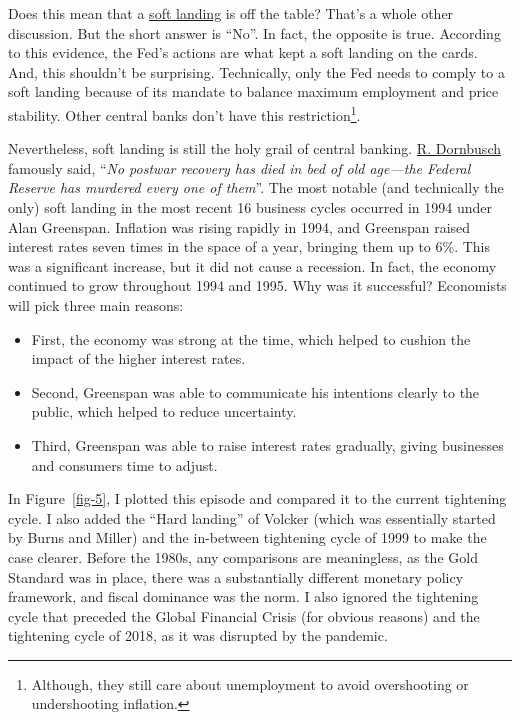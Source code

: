 \documentclass[
  letterpaper,
  DIV=11,
  numbers=noendperiod]{scrartcl}
\providecommand{\tightlist}{%
  \setlength{\itemsep}{0pt}\setlength{\parskip}{0pt}}\usepackage{longtable,booktabs,array}
\begin{document}
Does this mean that a
\href{https://www.investopedia.com/terms/s/softlanding.asp}{soft
landing} is off the table? That's a whole other discussion. But the
short answer is ``No''. In fact, the opposite is true. According to this
evidence, the Fed's actions are what kept a soft landing on the cards.
And, this shouldn't be surprising. Technically, only the Fed needs to
comply to a soft landing because of its mandate to balance maximum
employment and price stability. Other central banks don't have this
restriction\footnote{Although, they still care about unemployment to
  avoid overshooting or undershooting inflation.}.

Nevertheless, soft landing is still the holy grail of central banking.
\href{https://en.wikipedia.org/wiki/Rudi_Dornbusch}{R. Dornbusch}
famously said, ``\emph{No postwar recovery has died in bed of old
age---the Federal Reserve has murdered every one of them}''. The most
notable (and technically the only) soft landing in the most recent 16
business cycles occurred in 1994 under Alan Greenspan. Inflation was
rising rapidly in 1994, and Greenspan raised interest rates seven times
in the space of a year, bringing them up to 6\%. This was a significant
increase, but it did not cause a recession. In fact, the economy
continued to grow throughout 1994 and 1995. Why was it successful?
Economists will pick three main reasons:

\begin{itemize}
\tightlist
\item
  First, the economy was strong at the time, which helped to cushion the
  impact of the higher interest rates.
\item
  Second, Greenspan was able to communicate his intentions clearly to
  the public, which helped to reduce uncertainty.
\item
  Third, Greenspan was able to raise interest rates gradually, giving
  businesses and consumers time to adjust.
\end{itemize}

In Figure~\ref{fig-5}, I plotted this episode and compared it to the
current tightening cycle. I also added the ``Hard landing'' of Volcker
(which was essentially started by Burns and Miller) and the in-between
tightening cycle of 1999 to make the case clearer. Before the 1980s, any
comparisons are meaningless, as the Gold Standard was in place, there
was a substantially different monetary policy framework, and fiscal
dominance was the norm. I also ignored the tightening cycle that
preceded the Global Financial Crisis (for obvious reasons) and the
tightening cycle of 2018, as it was disrupted by the pandemic.
\end{document}
